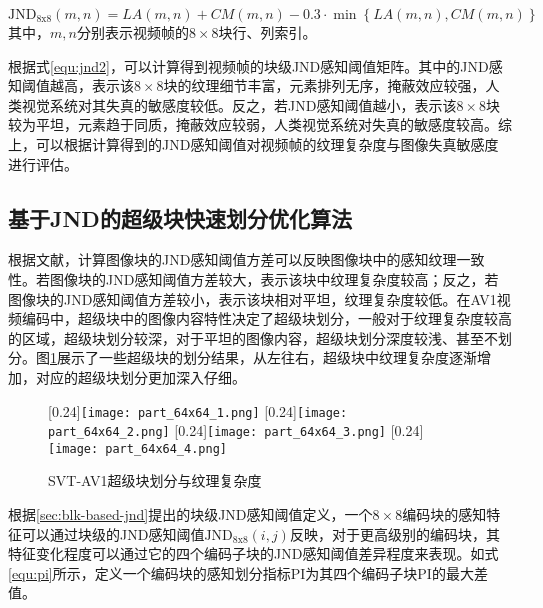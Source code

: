	\begin{equation} \label{equ:jnd2}
		\mathrm{JND_{8x8}}(m, n) = LA(m, n) + CM(m, n) - 0.3 \cdot \min \left\{LA(m, n) , CM(m, n)\right\}
	\end{equation}
	其中，$m, n$分别表示视频帧的$8\times 8$块行、列索引。

  根据式\ref{equ:jnd2}，可以计算得到视频帧的块级JND感知阈值矩阵。其中的JND感知阈值越高，表示该$8\times 8$块的纹理细节丰富，元素排列无序，掩蔽效应较强，人类视觉系统对其失真的敏感度较低。反之，若JND感知阈值越小，表示该$8\times 8$块较为平坦，元素趋于同质，掩蔽效应较弱，人类视觉系统对失真的敏感度较高。综上，可以根据计算得到的JND感知阈值对视频帧的纹理复杂度与图像失真敏感度进行评估。

  \subsection{基于JND的超级块快速划分优化算法}
  根据文献\cite{guoqingxiangImprovedAdaptiveQuantization2017}，计算图像块的JND感知阈值方差可以反映图像块中的感知纹理一致性。若图像块的JND感知阈值方差较大，表示该块中纹理复杂度较高；反之，若图像块的JND感知阈值方差较小，表示该块相对平坦，纹理复杂度较低。在AV1视频编码中，超级块中的图像内容特性决定了超级块划分，一般对于纹理复杂度较高的区域，超级块划分较深，对于平坦的图像内容，超级块划分深度较浅、甚至不划分。图\ref{fig:jnd-sb}展示了一些超级块的划分结果，从左往右，超级块中纹理复杂度逐渐增加，对应的超级块划分更加深入仔细。

  \begin{figure}[!hbtp]
    \centering
                    [0.24\textwidth]{\texttt{[image: part\_64x64\_1.png]}\label{fig:jnd-sb-1}}
                    [0.24\textwidth]{\texttt{[image: part\_64x64\_2.png]}}
                    [0.24\textwidth]{\texttt{[image: part\_64x64\_3.png]}}
                    [0.24\textwidth]{\texttt{[image: part\_64x64\_4.png]}\label{fig:jnd-sb-4}}
    \caption{SVT-AV1超级块划分与纹理复杂度}
    \label{fig:jnd-sb}
  \end{figure}

  根据\ref{sec:blk-based-jnd}提出的块级JND感知阈值定义，一个$8\times 8$编码块的感知特征可以通过块级的JND感知阈值$\mathrm{JND_{8x8}}(i, j)$反映，对于更高级别的编码块，其特征变化程度可以通过它的四个编码子块的JND感知阈值差异程度来表现。如式\ref{equ:pi}所示，定义一个编码块的感知划分指标PI为其四个编码子块PI的最大差值。

